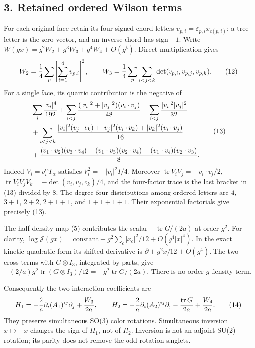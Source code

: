 \documentclass[
  11pt,
]{article}
\begin{document}
\subsection{3. Retained ordered Wilson
terms}\label{weak-coupling-part-15-retained-ordered-wilson-terms}

For each original face retain its four signed chord letters
\(v_{p,i}=\varepsilon_{p,i}x_{c(p,i)}\); a tree letter is the zero
vector, and an inverse chord has sign \(-1\). Write
\(W(gx)=g^2W_2+g^3W_3+g^4W_4+O(g^5)\). Direct multiplication gives \[
 W_2={1\over4}\sum_p\left|\sum_{i=1}^4v_{p,i}\right|^2,\qquad
 W_3={1\over4}\sum_p\sum_{i<j<k}
                   \det(v_{p,i},v_{p,j},v_{p,k}).
 \tag{12}
\] For a single face, its quartic contribution is the negative of \[
 \begin{split}
 &\sum_i {|v_i|^4\over192}
 +\sum_{i<j}{(|v_i|^2+|v_j|^2)(v_i\cdot v_j)\over48}
 +\sum_{i<j}{|v_i|^2|v_j|^2\over32}\\
 &+\sum_{i<j<k}
 { |v_i|^2(v_j\cdot v_k)+|v_j|^2(v_i\cdot v_k)
                         +|v_k|^2(v_i\cdot v_j)\over16}\\
 &+{(v_1\cdot v_2)(v_3\cdot v_4)
       -(v_1\cdot v_3)(v_2\cdot v_4)
       +(v_1\cdot v_4)(v_2\cdot v_3)\over8}.
 \end{split}
 \tag{13}
\] Indeed \(V_i=v_i^\alpha T_\alpha\) satisfies \(V_i^2=-|v_i|^2I/4\).
Moreover \(\operatorname{tr}V_iV_j=-v_i\cdot v_j/2\),
\(\operatorname{tr}V_iV_jV_k=-\det(v_i,v_j,v_k)/4\), and the four-factor
trace is the last bracket in (13) divided by \(8\). The degree-four
distributions among ordered letters are \(4\), \(3+1\), \(2+2\),
\(2+1+1\), and \(1+1+1+1\). Their exponential factorials give precisely
(13).

The half-density map (5) contributes the scalar
\(-\operatorname{tr}G/(2a)\) at order \(g^2\). For clarity,
\(\log\mathcal J(gx)=\mathrm{constant}
-g^2\sum_c|x_c|^2/12+O(g^4|x|^4)\). In the exact kinetic quadratic form
its shifted derivative is \(\partial+g^2x/12+O(g^4)\). The two cross
terms with \(G\otimes I_3\), integrated by parts, give
\(-(2/a)g^2\operatorname{tr}(G\otimes I_3)/12
=-g^2\operatorname{tr}G/(2a)\). There is no order-\(g\) density term.

Consequently the two interaction coefficients are \[
 H_1=-{2\over a}\partial_i(A_1)^{ij}\partial_j+{W_3\over2a},
 \qquad
 H_2=-{2\over a}\partial_i(A_2)^{ij}\partial_j
                  -{\operatorname{tr}G\over2a}+{W_4\over2a}.
 \tag{14}
\] They preserve simultaneous SO(3) color rotations. Simultaneous
inversion \(x\mapsto-x\) changes the sign of \(H_1\), not of \(H_2\).
Inversion is not an adjoint SU(2) rotation; its parity does not remove
the odd rotation singlets.
\end{document}

